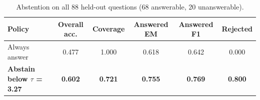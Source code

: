 \begin{table}[H]
\centering
\footnotesize
\caption{Abstention on all 88 held-out questions (68 answerable, 20 unanswerable).}
\label{tab:qaabstain}
\begin{tabular}{lccccc}
\toprule
Policy & Overall acc. & Coverage & Answered EM & Answered F1 & Rejected \\
\midrule
Always answer & 0.477 & 1.000 & 0.618 & 0.642 & 0.000 \\
\textbf{Abstain below $\tau$ = 3.27} & \textbf{0.602} & \textbf{0.721} & \textbf{0.755} & \textbf{0.769} & \textbf{0.800} \\
\bottomrule
\end{tabular}
\end{table}